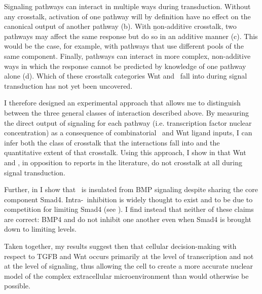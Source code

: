 Signaling pathways
can interact in multiple ways during transduction. Without any
crosstalk, activation of one pathway will
by definition have no effect on the canonical output of another pathway
(b).
With \b{non-additive} crosstalk, two pathways
may affect the same response but do so in an additive
manner (c).
This would be the case, for example, with pathways that use
different pools of the same component.
Finally, pathways can interact
in more complex, non-additive ways in which the response
cannot be predicted by knowledge of one pathway alone
(d).
Which of these crosstalk categories Wnt and \tgfbsf\ fall
into during signal transduction has not yet been uncovered.


I therefore designed an experimental approach that allows me to
distinguish between the three general classes of 
interaction described above. By measuring the direct
output of signaling for each pathway (i.e. transcription
factor nuclear concentration) as a consequence of
combinatorial \tgfbsf\ and Wnt ligand inputs, I can infer
both the class of crosstalk that the interactions fall into and
the quantitative extent of that crosstalk. Using
this approach, I show in  that Wnt and \tgfbsf,
in opposition to reports in the literature,
do not crosstalk at all during signal transduction.


Further, in 
I show that \tgf\ is insulated from BMP signaling despite
sharing the core component Smad4. Intra-\tgfbsf\ inhibition is
widely thought to exist and to be due to competition
for limiting Smad4 (see ).
I find instead that neither of these claims are correct:
BMP4 and  do not inhibit one another even when Smad4 is brought
down to limiting levels.


Taken together, my results suggest then that cellular decision-making
with respect to TGFB and Wnt occurs primarily at
the level of transcription and not at the level of signaling,
thus allowing the cell to create a more accurate nuclear
model of the complex extracellular microenvironment
than would otherwise be possible.











